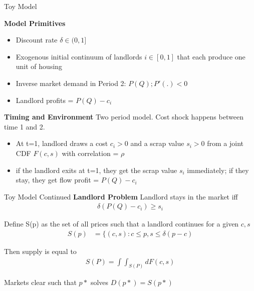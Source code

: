 \documentclass[10pt, xcolor=dvipsnames]{beamer}
\begin{document}


\begin{frame}{Toy Model}

\textbf{Model Primitives}
\begin{itemize}
    \item Discount rate $\delta \in (0,1]$
    \item Exogenous initial continuum of landlords $i \in [0,1]$ that each produce one unit of housing
    \item Inverse market demand in Period 2: $P(Q); P'(.) < 0$
    \item Landlord profits = $P(Q) - c_i$
\end{itemize}

\textbf{Timing and Environment}
Two period model. Cost shock happens between time 1 and 2.
\begin{itemize}
    \item At t=1, landlord draws a cost $c_i>0$ and a scrap value $s_i>0$ from a joint CDF $F(c,s)$ with correlation = $\rho$
    \item if the landlord exits at t=1, they get the scrap value $s_i$ immediately; if they stay, they get flow profit = $P(Q) - c_i$
\end{itemize}


\end{frame}

\begin{frame}{Toy Model Continued}
\textbf{Landlord Problem}
Landlord stays in the market iff
\begin{align*}
    \delta(P(Q) - c_i) \geq s_i
\end{align*}

Define S(p) as the set of all prices such that a landlord continues for a given $c,s$
\begin{align*}
    S(p) & = \big\{(c,s): c \leq p, s \leq \delta(p - c)
\end{align*}

Then supply is equal to 
\begin{align*}
    S(P) =  \int\int_{S(P)}dF(c,s)
\end{align*}

Markets clear such that $p*$ solves $D(p*) = S(p*)$


    
\end{frame}
\end{document}
